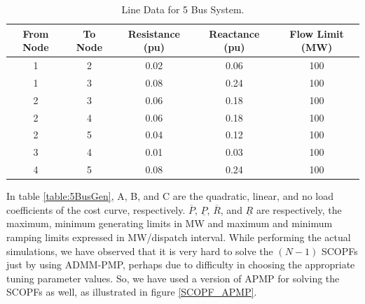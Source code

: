 \documentclass[preprint,12pt,3p]{elsarticle}
\begin{document}
	\begin{table}[ht] 
		
		\caption{Line Data for 5 Bus System.} %
		
		\centering %
		
		\begin{tabular}{| c | c | c | c | c |} %
			
			\hline\hline %
			
			From Node & To Node & Resistance (pu) & Reactance (pu)  & Flow Limit (MW) \\ [0.5ex] %
			
			
			\hline %
			1  &	2  &	0.02  &	0.06  &		100 \\ [0.5ex] %
			\hline
			1  &	3  &	0.08  &	0.24  &		100 \\ [0.5ex] %
			\hline
			2  &	3  &	0.06  &	0.18  &		100 \\ [0.5ex] %
			\hline
			2  &	4  &	0.06  &	0.18  &		100 \\ [0.5ex] %
			\hline
			2  &	5  &	0.04  &	0.12  &		100 \\ [0.5ex] %
			\hline
			3  &	4  &	0.01  &	0.03  &		100 \\ [0.5ex] %
			\hline
			4  &	5  &	0.08  &	0.24  &		100 \\ [0.5ex] %
			\hline
		\end{tabular} 
		
		\label{table:5BusLine} %
		
	\end{table}
	In table \ref{table:5BusGen}, A, B, and C are the quadratic, linear, and no load coefficients of the cost curve, respectively. $\overline{P}$, $\underline{P}$, $\overline{R}$, and $\underline{R}$ are respectively, the maximum, minimum generating limits in MW and maximum and minimum ramping limits expressed in MW/dispatch interval. While performing the actual simulations, we have observed that it is very hard to solve the $(N-1)$ SCOPFs just by using ADMM-PMP, perhaps due to difficulty in choosing the appropriate tuning parameter values. So, we have used a version of APMP for solving the SCOPFs as well, as illustrated in figure \ref{SCOPF_APMP}. 
\end{document}
